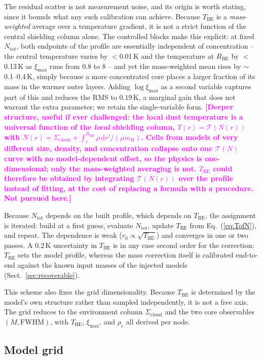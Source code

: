 \documentclass[11pt,a4paper]{article}
\newcommand{\note}[1]{\textcolor{magenta}{\textbf{[#1]}}}
\newcommand{\rhoc}{\rho_{\mathrm{c}}}
\newcommand{\rzero}{r_{0}}
\newcommand{\Rbe}{R_{\mathrm{BE}}}
\newcommand{\Tbe}{T_{\mathrm{BE}}}
\newcommand{\ximax}{\xi_{\mathrm{max}}}
\newcommand{\Scloud}{\Sigma_{\mathrm{cloud}}}
\newcommand{\mH}{m_{\mathrm{H}}}
\begin{document}
The residual scatter is not measurement noise, and its origin is worth stating,
since it bounds what any such calibration can achieve. Because $\Tbe$ is a
\emph{mass-weighted} average over a temperature gradient, it is not a strict
function of the central shielding column alone. The controlled blocks make this
explicit: at fixed $N_{\mathrm{tot}}$, both endpoints of the profile are
essentially independent of concentration -- the central temperature varies by
$<$0.01\,K and the temperature at $\Rbe$ by $<$0.13\,K as $\ximax$ runs from
$0.8$ to $8$ -- and yet the mass-weighted mean rises by $\sim$0.1--0.4\,K, simply
because a more concentrated core places a larger fraction of its mass in the
warmer outer layers. Adding $\log\ximax$ as a second variable captures part of
this and reduces the RMS to $0.19$\,K, a marginal gain that does not warrant the
extra parameter; we retain the single-variable form.
\note{Deeper structure, useful if ever challenged: the local dust temperature is a
universal function of the \emph{local} shielding column, $T(r) =
\mathcal{T}(N(r))$ with $N(r) = \Scloud + \int_{r}^{\Rbe}\rho\,\mathrm{d}r'/(\mu
\mH)$. Cells from models of very different size, density, and concentration
collapse onto one $\mathcal{T}(N)$ curve with no model-dependent offset, so the
physics is one-dimensional; only the mass-weighted averaging is not. $\Tbe$ could
therefore be obtained by integrating $\mathcal{T}(N(r))$ over the profile instead
of fitting, at the cost of replacing a formula with a procedure. Not pursued here.}

Because $N_{\mathrm{tot}}$ depends on the built profile, which depends on $\Tbe$,
the assignment is iterated: build at a first guess, evaluate $N_{\mathrm{tot}}$,
update $\Tbe$ from Eq.~(\ref{eq:TofN}), and repeat. The dependence is weak
($\rzero \propto \sqrt{\Tbe}$) and converges in one or two passes. A $0.2$\,K
uncertainty in $\Tbe$ is in any case second order for the correction: $\Tbe$ sets
the model profile, whereas the mass correction itself is calibrated
end-to-end against the known input masses of the injected models
(Sect.~\ref{sec:recoverable}).

This scheme also fixes the grid dimensionality. Because $\Tbe$ is determined by the
model's own structure rather than sampled independently, it is not a free axis. The
grid reduces to the environment column $\Scloud$ and the two core observables
$(M,\mathrm{FWHM})$, with $\Tbe$, $\ximax$, and $\rhoc$ all derived per node.

\subsection{Model grid}
\label{sec:grid}
\end{document}
